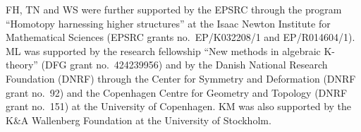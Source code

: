 FH, TN and WS were further supported by the EPSRC through the program ``Homotopy harnessing higher structures'' at the Isaac Newton Institute for Mathematical Sciences (EPSRC grants no.\ EP/K032208/1 and EP/R014604/1). 
ML was supported by the research fellowship ``New methods in algebraic K-theory'' (DFG grant no.\ 424239956) and by the Danish National Research Foundation (DNRF) through the Center for Symmetry and Deformation (DNRF grant no.\ 92) and the Copenhagen Centre for Geometry and Topology (DNRF grant no.\ 151) at the University of Copenhagen. 
KM was also supported by the K\&A Wallenberg Foundation at the University of Stockholm.

